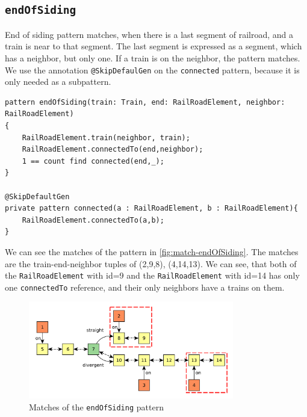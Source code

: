 \subsection{\texttt{endOfSiding}}

End of siding pattern matches, when there is a last segment of railroad, and a train is near to that segment.
The last segment is expressed as a segment, which has a neighbor, but only one.
If a train is on the neighbor, the pattern matches.
We use the annotation \texttt{@SkipDefaulGen} on the \texttt{connected} pattern, because it is only needed as a subpattern.

\begin{minipage}{\textwidth}
\begin{lstlisting}[language = vql]
pattern endOfSiding(train: Train, end: RailRoadElement, neighbor: RailRoadElement)
{
	RailRoadElement.train(neighbor, train);		
	RailRoadElement.connectedTo(end,neighbor);
	1 == count find connected(end,_);	
}

@SkipDefaultGen
private pattern connected(a : RailRoadElement, b : RailRoadElement){
	RailRoadElement.connectedTo(a,b);
}
\end{lstlisting}

\end{minipage}

We can see the matches of the pattern in \autoref{fig:match-endOfSiding}. 
The matches are the train-end-neighbor tuples of (2,9,8), (4,14,13). 
We can see, that both of the \texttt{RailRoadElement} with id=9 and the \texttt{RailRoadElement} with id=14 has only one \texttt{connectedTo} reference, and their only neighbors have a trains on them.

\begin{figure}[H]
	\begin{center}
		\includegraphics[width=0.8\textwidth]{figures/query-example-model-endofsiding.pdf}
	\end{center}
	\caption{Matches of the \texttt{endOfSiding} pattern}
	\label{fig:match-endOfSiding}
\end{figure}



